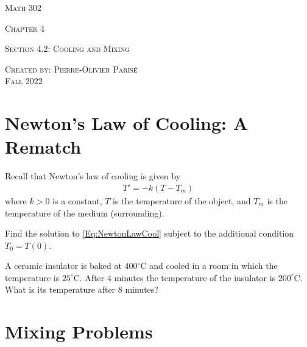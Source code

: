 \documentclass[12pt,a4paper]{article}
\newcounter{example}[section]
\begin{document}
\thispagestyle{empty}

\begin{center}
\vspace*{2.5cm}

{\Huge \textsc{Math 302}}

\vspace*{2cm}

{\LARGE \textsc{Chapter 4}} 

\vspace*{0.75cm}

\noindent\textsc{Section 4.2: Cooling and Mixing}

\vspace*{0.75cm}

\tableofcontents

\vfill

\noindent \textsc{Created by: Pierre-Olivier Paris{\'e}} \\
\textsc{Fall 2022}
\end{center}

\newpage

\section{Newton's Law of Cooling: A Rematch}

Recall that Newton's law of cooling is given by
	\begin{align}
	T' = -k (T - T_m ) \label{Eq:NewtonLawCool}
	\end{align}
where $k > 0$ is a constant, $T$ is the temperature of the object, and $T_m$ is the temperature of the medium (surrounding).

\begin{example}
Find the solution to \eqref{Eq:NewtonLawCool} subject to the additional condition $T_0 = T(0)$.
\end{example}

\newpage

\begin{example}
A ceramic insulator is baked at $400^{\circ}\text{C}$ and cooled in a room in which the temperature is $25^{\circ}\text{C}$. After $4$ minutes the temperature of the insulator is $200^{\circ} \text{C}$. What is its temperature after $8$ minutes?
\end{example}

\newpage

\section{Mixing Problems}
\end{document}
